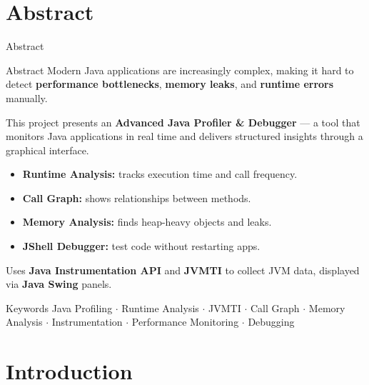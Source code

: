\documentclass[aspectratio=169]{beamer}
\begin{document}
\section{Abstract}

\begin{frame}{Abstract}
  \begin{block}{Abstract}
    \small
    Modern Java applications are increasingly complex, making it hard to
    detect \textbf{performance bottlenecks}, \textbf{memory leaks}, and
    \textbf{runtime errors} manually.

    This project presents an \textbf{Advanced Java Profiler \& Debugger} —
    a tool that monitors Java applications in real time and delivers
    structured insights through a graphical interface.

    \begin{itemize}\itemsep2pt
      \item \textbf{Runtime Analysis:} tracks execution time and call frequency.
      \item \textbf{Call Graph:} shows relationships between methods.
      \item \textbf{Memory Analysis:} finds heap-heavy objects and leaks.
      \item \textbf{JShell Debugger:} test code without restarting apps.
    \end{itemize}

    Uses \textbf{Java Instrumentation API} and \textbf{JVMTI} to collect
    JVM data, displayed via \textbf{Java Swing} panels.
  \end{block}

  \begin{exampleblock}{Keywords}
    \small
    Java Profiling $\cdot$ Runtime Analysis $\cdot$ JVMTI $\cdot$
    Call Graph $\cdot$ Memory Analysis $\cdot$ Instrumentation $\cdot$
    Performance Monitoring $\cdot$ Debugging
  \end{exampleblock}
\end{frame}

\section{Introduction}
\end{document}
